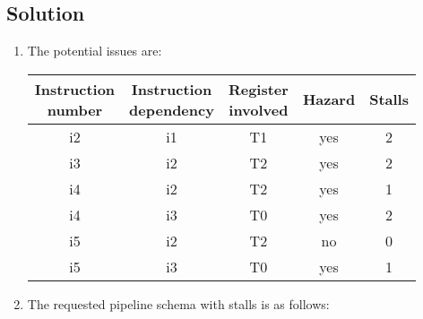 \subsection*{Solution}
\begin{enumerate}
    \item The potential issues are:
        \begin{table}[H]
            \centering
            \begin{tabular}{ccccc}
            \hline
            \makecell{\textbf{Instruction} \\ \textbf{number}}& \makecell{\textbf{Instruction} \\ \textbf{dependency}} & \makecell{\textbf{Register} \\ \textbf{involved}} & \textbf{Hazard} & \textbf{Stalls} \\ \hline
            i2                         & i1                                 & T1                       & yes             & 2               \\
            i3                         & i2                                 & T2                       & yes             & 2               \\
            i4                         & i2                                 & T2                       & yes             & 1               \\
            i4                         & i3                                 & T0                       & yes             & 2               \\
            i5                         & i2                                 & T2                       & no              & 0               \\
            i5                         & i3                                 & T0                       & yes             & 1               \\ \hline
            \end{tabular}%
        \end{table}
    \item The requested pipeline schema with stalls is as follows:
        \begin{table}[H]
            \centering
\end{table}
\end{enumerate}
